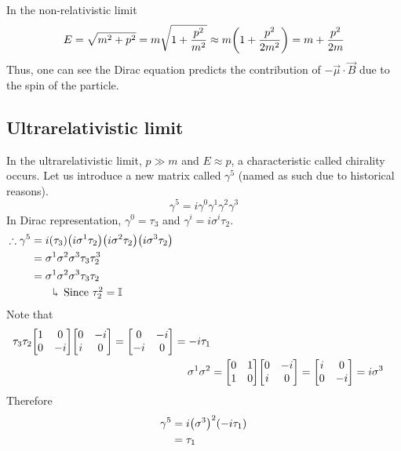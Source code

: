 \documentclass[12pt,a4paper,titlepage]{article}
\newcommand{\explain}[1]{%
	\quad\rotatebox[origin=c]{180}{\enskip$\Lsh$}\hfill
	\begin{minipage}[t]{\dimexpr\linewidth-8em\relax}
	#1
	\end{minipage}\hspace{4em}\bigskip
}
\begin{document}
In the non-relativistic limit
\begin{equation}
E=\sqrt{m^{2}+p^{2}}=m\sqrt{1+\frac{p^{2}}{m^{2}}}\approx m\qty(1+\frac{p^{2}}{2m^{2}})=m+\frac{p^{2}}{2m}
\end{equation}
Thus, one can see the Dirac equation predicts the contribution of $-\vec{\mu}\cdot\vec{B}$ due to the spin of the particle.

\subsection{Ultrarelativistic limit}
In the ultrarelativistic limit, $p\gg m$ and $E\approx p$, a characteristic called chirality occurs. Let us introduce a new matrix called $\gamma^{5}$ (named as such due to historical reasons).
\begin{equation}
\gamma^{5}=i\gamma^{0}\gamma^{1}\gamma^{2}\gamma^{3}
\end{equation}
In Dirac representation, $\gamma^{0}=\tau_{3}$ and $\gamma^{i}=i\sigma^{i}\tau_{2}$.
\begin{equation}
\begin{aligned}
\therefore\gamma^{5}&=i\qty(\tau_{3})\qty(i\sigma^{1}\tau_{2})\qty(i\sigma^{2}\tau_{2})\qty(i\sigma^{3}\tau_{2})\\
&=\sigma^{1}\sigma^{2}\sigma^{3}\tau_{3}\tau_{2}^{3}\\
&=\sigma^{1}\sigma^{2}\sigma^{3}\tau_{3}\tau_{2}\\
&\quad\explain{Since $\tau_{2}^{2}=\mathbb{I}$}
\end{aligned}
\end{equation}
Note that
\begin{equation}
\begin{aligned}
\tau_{3}\tau_{2}\mqty[1 & 0 \\ 0 & -i]\mqty[0 & -i \\ i & 0]=\mqty[0 & -i \\ -i & 0]=-i\tau_{1}\\
\sigma^{1}\sigma^{2}&=\mqty[0 & 1 \\ 1 & 0]\mqty[0 & -i \\ i & 0]=\mqty[i & 0\\ 0 & -i]=i\sigma^{3}
\end{aligned}
\end{equation}
Therefore
\begin{equation}
\begin{aligned}
\gamma^{5}&=i\qty(\sigma^{3})^{2}\qty(-i\tau_{1})\\
&=\tau_{1}
\end{aligned}
\end{equation}
\end{document}
